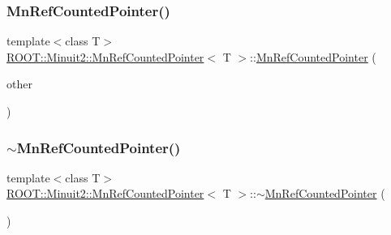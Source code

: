 \subsubsection{\texorpdfstring{MnRefCountedPointer()}{MnRefCountedPointer()}\hspace{0.1cm}{\footnotesize\ttfamily [6/9]}}
{\footnotesize\ttfamily template$<$class T$>$ \\
\mbox{\hyperlink{classROOT_1_1Minuit2_1_1MnRefCountedPointer}{R\+O\+O\+T\+::\+Minuit2\+::\+Mn\+Ref\+Counted\+Pointer}}$<$ T $>$\+::\mbox{\hyperlink{classROOT_1_1Minuit2_1_1MnRefCountedPointer}{Mn\+Ref\+Counted\+Pointer}} (\begin{DoxyParamCaption}\item[{const \mbox{\hyperlink{classROOT_1_1Minuit2_1_1MnRefCountedPointer}{Mn\+Ref\+Counted\+Pointer}}$<$ T $>$ \&}]{other }\end{DoxyParamCaption})\hspace{0.3cm}{\ttfamily [inline]}}

\mbox{\label{classROOT_1_1Minuit2_1_1MnRefCountedPointer_ae3bdd5d92c9c44bd3490954bca60fd47}} 
\subsubsection{\texorpdfstring{$\sim$MnRefCountedPointer()}{~MnRefCountedPointer()}\hspace{0.1cm}{\footnotesize\ttfamily [2/3]}}
{\footnotesize\ttfamily template$<$class T$>$ \\
\mbox{\hyperlink{classROOT_1_1Minuit2_1_1MnRefCountedPointer}{R\+O\+O\+T\+::\+Minuit2\+::\+Mn\+Ref\+Counted\+Pointer}}$<$ T $>$\+::$\sim$\mbox{\hyperlink{classROOT_1_1Minuit2_1_1MnRefCountedPointer}{Mn\+Ref\+Counted\+Pointer}} (\begin{DoxyParamCaption}{ }\end{DoxyParamCaption})\hspace{0.3cm}{\ttfamily [inline]}}

\mbox{\label{classROOT_1_1Minuit2_1_1MnRefCountedPointer_ab597b297b8bc186cf67a2c6874c2d169}} 
